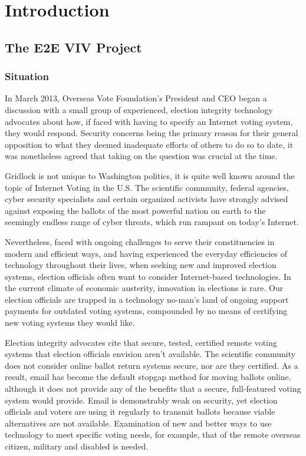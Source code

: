 \chapter{Introduction}
\label{chapter:introduction}

\section{The E2E VIV Project}

\subsection{Situation}

In March 2013, Overseas Vote Foundation’s President and CEO began a
discussion with a small group of experienced, election integrity
technology advocates about how, if faced with having to specify an
Internet voting system, they would respond. Security concerns being
the primary reason for their general opposition to what they deemed
inadequate efforts of others to do so to date, it was nonetheless
agreed that taking on the question was crucial at the time. 

Gridlock is not unique to Washington politics, it is quite well known
around the topic of Internet Voting in the U.S. The scientific
community, federal agencies, cyber security specialists and certain
organized activists have strongly advised against exposing the ballots
of the most powerful nation on earth to the seemingly endless range of
cyber threats, which run rampant on today’s Internet. 

Nevertheless, faced with ongoing challenges to serve their
constituencies in modern and efficient ways, and having experienced
the everyday efficiencies of technology throughout their lives, when
seeking new and improved election systems, election officials often
want to consider Internet-based technologies. In the current climate
of economic austerity, innovation in elections is rare. Our election
officials are trapped in a technology no-man’s land of ongoing support
payments for outdated voting systems, compounded by no means of
certifying new voting systems they would like.

Election integrity advocates cite that secure, tested, certified
remote voting systems that election officials envision aren’t
available. The scientific community does not consider online ballot
return systems secure, nor are they certified. As a result, email has
become the default stopgap method for moving ballots online, although
it does not provide any of the benefits that a secure, full-featured
voting system would provide. Email is demonstrably weak on security,
yet election officials and voters are using it regularly to transmit
ballots because viable alternatives are not available. Examination of
new and better ways to use technology to meet specific voting needs,
for example, that of the remote overseas citizen, military and
disabled is needed. 

